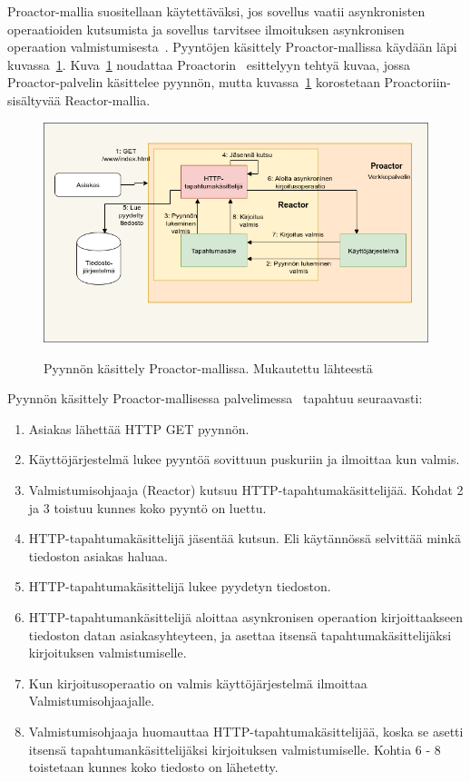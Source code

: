 \documentclass[finnish]{tktltiki2}%
\theoremstyle{definition}
\theoremstyle{remark}
\begin{document}
Proactor-mallia suositellaan käytettäväksi, jos sovellus vaatii
asynkronisten operaatioiden kutsumista ja sovellus tarvitsee ilmoituksen
asynkronisen operaation valmistumisesta~\cite{pyarali_proactor_1997}.
Pyyntöjen käsittely Proactor-mallissa käydään läpi kuvassa~\ref{fig:proactor}.
Kuva~\ref{fig:proactor} noudattaa Proactorin~\cite{hu_applying_1998} esittelyyn tehtyä
kuvaa, jossa Proactor-palvelin käsittelee pyynnön, mutta kuvassa~\ref{fig:proactor}
korostetaan Proactoriin-sisältyvää Reactor-mallia.
\begin{figure}
  \caption{Pyynnön käsittely Proactor-mallissa. Mukautettu lähteestä~\cite{hu_applying_1998}}
  \includegraphics[scale=0.6]{Proactor.png}\label{fig:proactor}
\end{figure}
Pyynnön käsittely Proactor-mallisessa palvelimessa~\cite{hu_applying_1998} 
tapahtuu seuraavasti:
    \begin{enumerate}
      \item Asiakas lähettää HTTP GET pyynnön.
      \item Käyttöjärjestelmä lukee pyyntöä sovittuun puskuriin ja ilmoittaa kun valmis.
      \item Valmistumisohjaaja (Reactor) kutsuu HTTP-tapahtumakäsittelijää.
        Kohdat 2 ja 3 toistuu kunnes koko pyyntö on luettu.
      \item HTTP-tapahtumakäsittelijä jäsentää kutsun. Eli
        käytännössä selvittää minkä tiedoston asiakas haluaa.
      \item HTTP-tapahtumakäsittelijä lukee pyydetyn tiedoston.
      \item HTTP-tapahtumankäsittelijä aloittaa asynkronisen operaation
        kirjoittaakseen tiedoston datan asiakasyhteyteen, ja asettaa
        itsensä tapahtumakäsittelijäksi kirjoituksen valmistumiselle.
      \item Kun kirjoitusoperaatio on valmis käyttöjärjestelmä ilmoittaa
        Valmistumisohjaajalle.
      \item Valmistumisohjaaja huomauttaa HTTP-tapahtumakäsittelijää,
        koska se asetti itsensä tapahtumankäsittelijäksi kirjoituksen
        valmistumiselle. Kohtia 6 - 8 toistetaan kunnes koko tiedosto on lähetetty.
    \end{enumerate}
\end{document}
